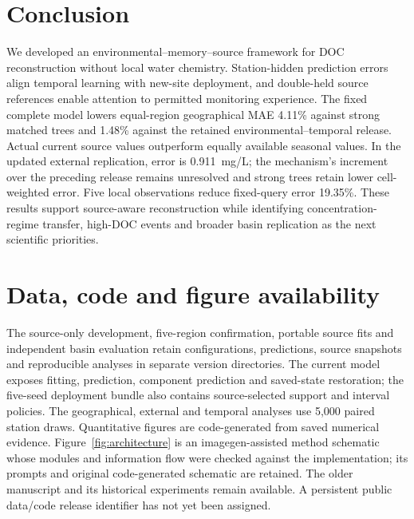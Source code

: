 \documentclass[11pt]{article}
\begin{document}
\section{Conclusion}
We developed an environmental--memory--source framework for DOC reconstruction without local water chemistry. Station-hidden prediction errors align temporal learning with new-site deployment, and double-held source references enable attention to permitted monitoring experience. The fixed complete model lowers equal-region geographical MAE 4.11\% against strong matched trees and 1.48\% against the retained environmental--temporal release. Actual current source values outperform equally available seasonal values. In the updated external replication, error is 0.911~mg/L; the mechanism's increment over the preceding release remains unresolved and strong trees retain lower cell-weighted error. Five local observations reduce fixed-query error 19.35\%. These results support source-aware reconstruction while identifying concentration-regime transfer, high-DOC events and broader basin replication as the next scientific priorities.

\section*{Data, code and figure availability}
The source-only development, five-region confirmation, portable source fits and independent basin evaluation retain configurations, predictions, source snapshots and reproducible analyses in separate version directories. The current model exposes fitting, prediction, component prediction and saved-state restoration; the five-seed deployment bundle also contains source-selected support and interval policies. The geographical, external and temporal analyses use 5,000 paired station draws. Quantitative figures are code-generated from saved numerical evidence. Figure~\ref{fig:architecture} is an imagegen-assisted method schematic whose modules and information flow were checked against the implementation; its prompts and original code-generated schematic are retained. The older manuscript and its historical experiments remain available. A persistent public data/code release identifier has not yet been assigned.
\end{document}
